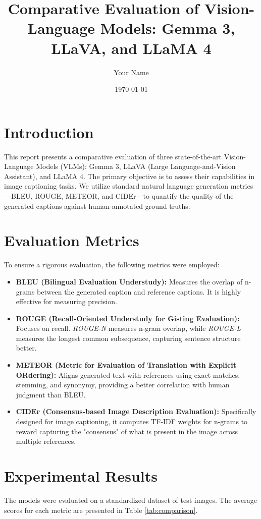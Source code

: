 \documentclass{article}
\title{Comparative Evaluation of Vision-Language Models: Gemma 3, LLaVA, and LLaMA 4}
\author{Your Name}
\date{\today}
\begin{document}
\maketitle

\section{Introduction}
This report presents a comparative evaluation of three state-of-the-art Vision-Language Models (VLMs): Gemma 3, LLaVA (Large Language-and-Vision Assistant), and LLaMA 4. The primary objective is to assess their capabilities in image captioning tasks. We utilize standard natural language generation metrics---BLEU, ROUGE, METEOR, and CIDEr---to quantify the quality of the generated captions against human-annotated ground truths.

\section{Evaluation Metrics}
To ensure a rigorous evaluation, the following metrics were employed:

\begin{itemize}
    \item \textbf{BLEU (Bilingual Evaluation Understudy):} Measures the overlap of n-grams between the generated caption and reference captions. It is highly effective for measuring precision.
    \item \textbf{ROUGE (Recall-Oriented Understudy for Gisting Evaluation):} Focuses on recall. \textit{ROUGE-N} measures n-gram overlap, while \textit{ROUGE-L} measures the longest common subsequence, capturing sentence structure better.
    \item \textbf{METEOR (Metric for Evaluation of Translation with Explicit ORdering):} Aligns generated text with references using exact matches, stemming, and synonymy, providing a better correlation with human judgment than BLEU.
    \item \textbf{CIDEr (Consensus-based Image Description Evaluation):} Specifically designed for image captioning, it computes TF-IDF weights for n-grams to reward capturing the "consensus" of what is present in the image across multiple references.
\end{itemize}

\section{Experimental Results}
The models were evaluated on a standardized dataset of test images. The average scores for each metric are presented in Table \ref{tab:comparison}.
\end{document}
